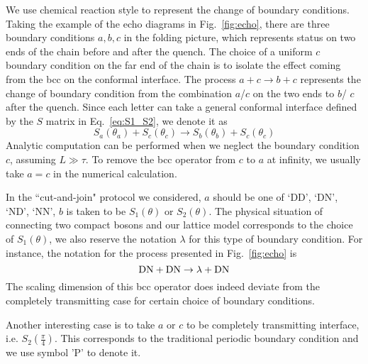 
We use chemical reaction style to represent the change of boundary conditions. Taking the example of the echo diagrams in Fig.~\ref{fig:echo}, there are three boundary conditions $a,b,c$ in the folding picture, which represents status on two ends of the chain before and after the quench. The choice of a uniform $c$ boundary condition on the far end of the chain is to isolate the effect coming from the bcc on the conformal interface. The process $a + c \rightarrow b + c$ represents the change of boundary condition from the combination $a$/$c$ on the two ends to $b$/ $c$ after the quench. Since each letter can take a general conformal interface defined by the $S$ matrix in Eq.~\eqref{eq:S1_S2}, we denote it as
\begin{equation}
S_a( \theta_a ) + S_c( \theta_c) \rightarrow S_b( \theta_b )  + S_c( \theta_c ) 
\end{equation}
Analytic computation can be performed when we neglect the boundary condition $c$, assuming $L \gg \tau$. To remove the bcc operator from $c$ to $a$ at infinity, we usually take $a = c$ in the numerical calculation. 

In the ``cut-and-join" protocol we considered, $a$ should be one of `DD', `DN', `ND', `NN', $b$ is taken to be $S_1( \theta )$ or $S_2( \theta )$. The physical situation of connecting two compact bosons and our lattice model corresponds to the choice of $S_1( \theta)$, we also reserve the notation $\lambda$ for this type of boundary condition. For instance, the notation for the process presented in Fig.~\ref{fig:echo} is
\begin{equation}
{\rm DN }  + {\rm DN} \rightarrow \lambda + { \rm DN} 
\end{equation}
The scaling dimension of this bcc operator does indeed deviate from the completely transmitting case for certain choice of boundary conditions. 

Another interesting case is to take $a$ or $c$ to be completely transmitting interface, i.e. $S_2( \frac{\pi}{4} )$. This corresponds to the traditional periodic boundary condition and we use symbol 'P' to denote it. 


